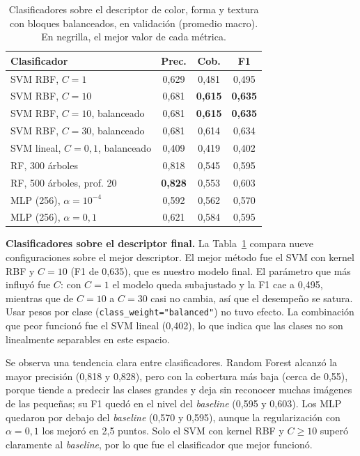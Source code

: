 \begin{table}[t]
  \centering
  \small
  \caption{Clasificadores sobre el descriptor de color, forma y textura con bloques balanceados, en validación (promedio macro). En negrilla, el mejor valor de cada métrica.}
  \label{tab:clasif}
  \begin{tabular}{@{}lccc@{}}
    \toprule
    Clasificador & Prec. & Cob. & F1 \\
    \midrule
    SVM RBF, $C=1$                    & 0,629 & 0,481 & 0,495 \\
    SVM RBF, $C=10$                   & 0,681 & \textbf{0,615} & \textbf{0,635} \\
    SVM RBF, $C=10$, balanceado       & 0,681 & \textbf{0,615} & \textbf{0,635} \\
    SVM RBF, $C=30$, balanceado       & 0,681 & 0,614 & 0,634 \\
    SVM lineal, $C=0{,}1$, balanceado & 0,409 & 0,419 & 0,402 \\
    RF, 300 árboles                   & 0,818 & 0,545 & 0,595 \\
    RF, 500 árboles, prof. 20         & \textbf{0,828} & 0,553 & 0,603 \\
    MLP (256), $\alpha=10^{-4}$       & 0,592 & 0,562 & 0,570 \\
    MLP (256), $\alpha=0{,}1$         & 0,621 & 0,584 & 0,595 \\
    \bottomrule
  \end{tabular}
\end{table}

\textbf{Clasificadores sobre el descriptor final.} La Tabla~\ref{tab:clasif} compara nueve configuraciones sobre el mejor descriptor. El mejor método fue el SVM con kernel RBF y $C=10$ (F1 de 0,635), que es nuestro modelo final. El parámetro que más influyó fue $C$: con $C=1$ el modelo queda subajustado y la F1 cae a 0,495, mientras que de $C=10$ a $C=30$ casi no cambia, así que el desempeño se satura. Usar pesos por clase (\texttt{class\_weight="balanced"}) no tuvo efecto. La combinación que peor funcionó fue el SVM lineal (0,402), lo que indica que las clases no son linealmente separables en este espacio.

Se observa una tendencia clara entre clasificadores. Random Forest alcanzó la mayor precisión (0,818 y 0,828), pero con la cobertura más baja (cerca de 0,55), porque tiende a predecir las clases grandes y deja sin reconocer muchas imágenes de las pequeñas; su F1 quedó en el nivel del \textit{baseline} (0,595 y 0,603). Los MLP quedaron por debajo del \textit{baseline} (0,570 y 0,595), aunque la regularización con $\alpha=0{,}1$ los mejoró en 2,5 puntos. Solo el SVM con kernel RBF y $C\geq10$ superó claramente al \textit{baseline}, por lo que fue el clasificador que mejor funcionó.
